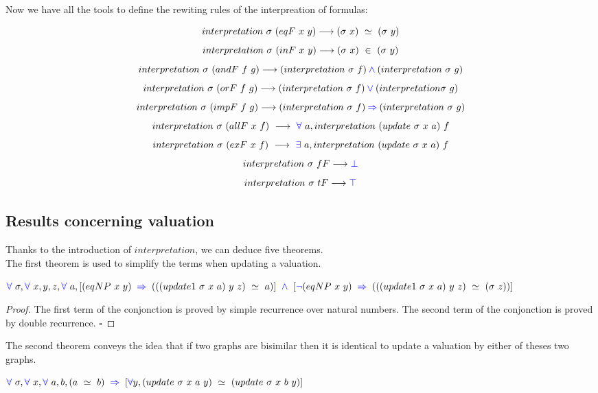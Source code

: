 \documentclass[a4paper]{article}
\begin{document}
Now we have all the tools to define the rewiting rules of the interpreation of formulas:

$$interpretation \ \sigma \ (eqF \ x \ y) \longrightarrow (\sigma \ x) \ \simeq \ (\sigma \ y)$$
$$interpretation \ \sigma \ (inF \ x \ y) \longrightarrow (\sigma \ x) \ \in \ (\sigma \ y)$$
$$interpretation \ \sigma \ (andF \ f \ g) \lra (interpretation \ \sigma \ f) \conj (interpretation \ \sigma \ g)$$
$$interpretation \ \sigma \ (orF \ f \ g) \longrightarrow (interpretation \ \sigma \ f) \mathbin{\color{blue} \vee}  (interpretation \sigma \ g)$$
$$interpretation \ \sigma \ (impF \ f \ g) \lra (interpretation \ \sigma \ f) \imp (interpretation \ \sigma \ g)$$
$$interpretation \ \sigma \ (allF \ x \ f) \ \lra \ \fa \ a, interpretation \ (update \ \sigma \ x \ a) \ f$$
$$interpretation \ \sigma \ (exF \ x \ f) \ \lra \ \ex \ a, interpretation \ (update \ \sigma \ x \ a) \ f$$
$$interpretation \ \sigma \ fF \longrightarrow {\color{blue} \bot}$$
$$interpretation \ \sigma \ tF \longrightarrow {\color{blue} \top}$$

\subsection{Results concerning valuation}

Thanks to the introduction of $interpretation$, we can deduce five theorems. \\

The first theorem is used to simplify the terms when updating a valuation.

\begin{theorem}
$\fa \ \sigma, \fa \ x, y, z, \fa \ a, [(eqNP \ x \ y) \ \imp \ (((update1 \ \sigma \ x \ a) \ y \ z) \ \simeq \ a)] \ \conj \ [\blneg(eqNP \ x \ y) \ \imp \ (((update1 \ \sigma \ x \ a) \ y \ z) \ \simeq \ (\sigma \ z))]$
\end{theorem}

\begin{proof}
The first term of the conjonction is proved by simple recurrence over natural numbers. The second term of the conjonction is proved by double recurrence. $\square$
\end{proof}

The second theorem conveys the idea that if two graphs are bisimilar then it is identical to update a valuation by either of theses two graphs.

\begin{theorem}
$\fa \ \sigma, \fa \ x, \fa \ a, b, (a \ \simeq \ b) \ \imp \ [\fa y, (update \ \sigma \ x \ a \ y) \ \simeq \ (update \ \sigma \ x \ b \ y)]$
\end{theorem}
\end{document}
